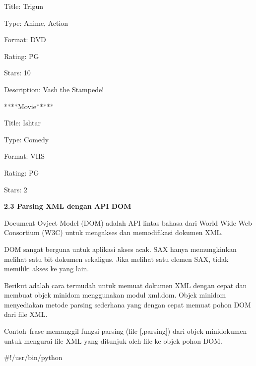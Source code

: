 \noindent 
{\fontsize{10pt}{10pt}\selectfont Title: Trigun} \par
\noindent 
{\fontsize{10pt}{10pt}\selectfont Type: Anime, Action} \par
\noindent 
{\fontsize{10pt}{10pt}\selectfont Format: DVD} \par
\noindent 
{\fontsize{10pt}{10pt}\selectfont Rating: PG} \par
\noindent 
{\fontsize{10pt}{10pt}\selectfont Stars: 10} \par
\noindent 
{\fontsize{10pt}{10pt}\selectfont Description: Vash the Stampede!} \par
\noindent 
{\fontsize{10pt}{10pt}\selectfont *****Movie*****} \par
\noindent 
{\fontsize{10pt}{10pt}\selectfont Title: Ishtar} \par
\noindent 
{\fontsize{10pt}{10pt}\selectfont Type: Comedy} \par
\noindent 
{\fontsize{10pt}{10pt}\selectfont Format: VHS} \par
\noindent 
{\fontsize{10pt}{10pt}\selectfont Rating: PG} \par
\noindent 
{\fontsize{10pt}{10pt}\selectfont Stars: 2} \par
\noindent 
\vspace{10pt}
\noindent 
\textbf{2.3 Parsing XML dengan API DOM} \par
\noindent 
 \hspace*{0.5in} Document Ovject Model (DOM) adalah API lintas bahasa dari World Wide Web Consortium (W3C) untuk mengakses dan memodifikasi dokumen XML. \par
\noindent 
 \hspace*{0.5in} DOM sangat berguna untuk aplikasi akses acak. SAX hanya memungkinkan melihat satu bit dokumen sekaligus. Jika melihat satu elemen SAX, tidak memiliki akses ke yang lain. \par
\noindent 
 \hspace*{0.5in} Berikut adalah cara termudah untuk memuat dokumen XML dengan cepat dan membuat objek minidom menggunakan modul xml.dom. Objek minidom menyediakan metode parsing sederhana yang dengan cepat memuat pohon DOM dari file XML. \par
\noindent 
 \hspace*{0.5in} Contoh~frase memanggil fungsi  parsing (file [,parsing]) dari objek minidokumen untuk mengurai file XML yang ditunjuk oleh file ke objek pohon DOM. \par
\noindent 
 $  \#  $!/usr/bin/python \par

